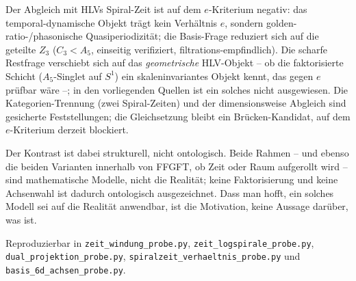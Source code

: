 Der Abgleich mit HLVs Spiral-Zeit ist auf dem $e$-Kriterium negativ: das temporal-dynamische
Objekt trägt kein Verhältnis $e$, sondern golden-ratio-/phasonische Quasiperiodizität; die
Basis-Frage reduziert sich auf die geteilte $Z_3$ ($C_3<A_5$, einseitig verifiziert,
filtrations-empfindlich). Die scharfe Restfrage verschiebt sich auf das \emph{geometrische}
HLV-Objekt -- ob die faktorisierte Schicht ($A_5$-Singlet auf $S^1$) ein skaleninvariantes Objekt
kennt, das gegen $e$ prüfbar wäre --; in den vorliegenden Quellen ist ein solches nicht
ausgewiesen. Die Kategorien-Trennung (zwei Spiral-Zeiten) und der dimensionsweise Abgleich sind
gesicherte Feststellungen; die Gleichsetzung bleibt ein Brücken-Kandidat, auf dem $e$-Kriterium
derzeit blockiert.

Der Kontrast ist dabei strukturell, nicht ontologisch. Beide Rahmen -- und ebenso die beiden
Varianten innerhalb von FFGFT, ob Zeit oder Raum aufgerollt wird -- sind mathematische Modelle,
nicht die Realität; keine Faktorisierung und keine Achsenwahl ist dadurch ontologisch
ausgezeichnet. Dass man hofft, ein solches Modell sei auf die Realität anwendbar, ist die
Motivation, keine Aussage darüber, was ist.

Reproduzierbar in \texttt{zeit\_windung\_probe.py}, \texttt{zeit\_logspirale\_probe.py},
\texttt{dual\_projektion\_probe.py}, \texttt{spiralzeit\_verhaeltnis\_probe.py} und
\texttt{basis\_6d\_achsen\_probe.py}.
